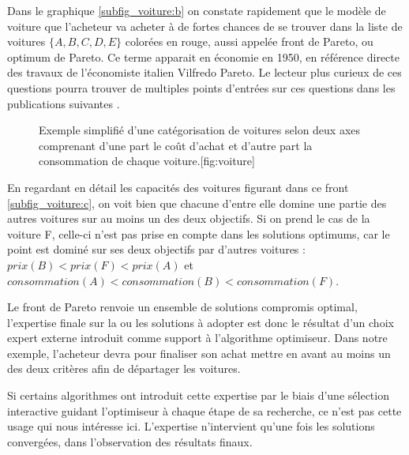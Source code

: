 Dans le graphique \ref{subfig_voiture:b} on constate rapidement que le modèle de voiture que l'acheteur va acheter à de fortes chances de se trouver dans la liste de voitures $\{ A,B,C,D,E \}$ colorées en rouge, aussi appelée front de Pareto, ou optimum de Pareto. Ce terme apparait en économie en 1950, en référence directe des travaux de l'économiste italien Vilfredo Pareto. Le lecteur plus curieux de ces questions pourra trouver de multiples points d'entrées sur ces questions dans les publications suivantes \autocites{Ehrgott2012,Koksalan2011,Koksalan2013}.

\begin{figure}[!htbp]
	\begin{sidecaption}[fortoc]{Exemple simplifié d'une catégorisation de voitures selon deux axes comprenant d'une part le coût d'achat et d'autre part la consommation de chaque voiture.}[fig:voiture]
	\centering
	  \qquad
 \end{sidecaption}
\end{figure}

\sloppy En regardant en détail les capacités des voitures figurant dans ce front \ref{subfig_voiture:c}, on voit bien que chacune d'entre elle domine une partie des autres voitures sur au moins un des deux objectifs. Si on prend le cas de la voiture F, celle-ci n'est pas prise en compte dans les solutions optimums, car le point est dominé sur ses deux objectifs par d'autres voitures : $ prix(B) < prix(F) < prix(A) $ et $consommation(A) < consommation (B) < consommation(F)$.

Le front de Pareto renvoie un ensemble de solutions compromis optimal, l'expertise finale sur la ou les solutions à adopter est donc le résultat d'un choix expert externe introduit comme support à l'algorithme optimiseur. Dans notre exemple, l'acheteur devra pour finaliser son achat mettre en avant au moins un des deux critères afin de départager les voitures.

Si certains algorithmes ont introduit cette expertise par le biais d'une sélection interactive guidant l'optimiseur à chaque étape de sa recherche, ce n'est pas cette usage qui nous intéresse ici. L'expertise n'intervient qu'une fois les solutions convergées, dans l'observation des résultats finaux.

